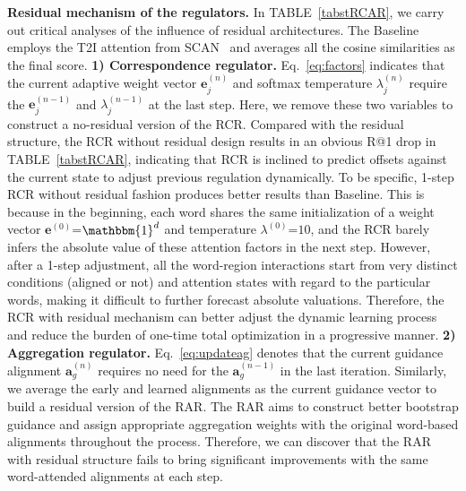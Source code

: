 \documentclass[journal]{IEEEtran}\newcommand{\ignore}[1]{}
\begin{document}
\textbf{Residual mechanism of the regulators.} 
In TABLE~\ref{tabstRCAR}, we carry out critical analyses of the influence of residual architectures. The Baseline employs the T2I attention from SCAN~\cite{SCAN} and averages all the cosine similarities as the final score. 
\textbf{1) Correspondence regulator.} Eq.~\eqref{eq:factors} indicates that the current adaptive weight vector $\boldsymbol{e}_{j}^{(n)}$ and softmax temperature $\lambda_{j}^{(n)}$ require the $\boldsymbol{e}_{j}^{(n-1)}$ and $\lambda_{j}^{(n-1)}$ at the last step. Here, we remove these two variables to construct a no-residual version of the RCR.
Compared with the residual structure, the RCR without residual design results in an obvious R@1 drop in TABLE~\ref{tabstRCAR}, indicating that RCR is inclined to predict offsets against the current state to adjust previous regulation dynamically. To be specific, 1-step RCR without residual fashion produces better results than Baseline. This is because in the beginning, each word shares the same initialization of a weight vector $\mathbf{e}^{(0)}$=$\mathbbm{1}^{d}$ and temperature $\lambda^{(0)}$=$10$, and the RCR barely infers the absolute value of these attention factors in the next step. However, after a 1-step adjustment, all the word-region interactions start from very distinct conditions (aligned or not) and attention states with regard to the particular words, making it difficult to further forecast absolute valuations. Therefore, the RCR with residual mechanism can better adjust the dynamic learning process and reduce the burden of one-time total optimization in a progressive manner. 
\textbf{2) Aggregation regulator.} Eq.~\eqref{eq:updateag} denotes that the current guidance alignment $\boldsymbol{a}_{g}^{(n)}$ requires no need for the $\boldsymbol{a}_{g}^{(n-1)}$ in the last iteration. Similarly, we average the early and learned alignments as the current guidance vector to build a residual version of the RAR.
The RAR aims to construct better bootstrap guidance and assign appropriate aggregation weights with the original word-based alignments throughout the process. Therefore, we can discover that the RAR with residual structure fails to bring significant improvements with the same word-attended alignments at each step. 
\end{document}

